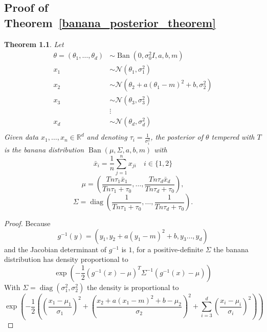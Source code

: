 \documentclass[english,twoside,openright]{HYgraduMLDS}
\newtheorem{theorem}{Theorem}
\newcommand{\R}{\mathbb{R}}
\newcommand{\caln}{{\mathcal{N}}}
\DeclareMathOperator{\ban}{Ban}
\DeclareMathOperator{\diag}{diag}
\begin{document}
\begin{appendices}
\myappendixtitle

\chapter{Proof of Theorem~\ref{banana_posterior_theorem}}\label{banana_posterior_theorem_proof}

\setcounter{temp_counter}{\value{theorem}}
\setcounter{theorem}{\value{banana_posterior_theorem_number}}
\addtocounter{theorem}{-1}
\begin{theorem}
    Let
    \begin{align*}
        \theta = (\theta_1,\dotsc, \theta_d) &\sim
        \ban(0, \sigma_0^2I, a, b, m) \\
        x_1 &\sim \caln(\theta_1, \sigma_1^2) \\
        x_2 &\sim \caln(\theta_2 + a(\theta_1 - m)^2 + b, \sigma_2^2)\\
        x_3 &\sim \caln(\theta_3, \sigma_3^2) \\
            &\vdots \\
        x_d &\sim \caln(\theta_d, \sigma_d^2) \\
    \end{align*}
    Given data \(x_1,\dotsc, x_n\in \R^d\) and
    denoting \(\tau_i = \frac{1}{\sigma_i^2}\),
    the posterior of \(\theta\) tempered with \(T\) is the banana distribution
    \(\ban(\mu, \Sigma, a, b, m)\)
    with
    \[
        \bar{x}_i = \frac{1}{n}\sum_{j=1}^n x_{ji} \quad i\in \{1, 2\}
    \]
    \[
        \mu = \left(\frac{Tn\tau_1\bar{x}_1}{Tn\tau_1 + \tau_0},\dotsc,
        \frac{Tn\tau_d\bar{x}_d}{Tn\tau_d + \tau_0}\right),
    \]
    \[
        \Sigma = \diag\left(
            \frac{1}{Tn\tau_1 + \tau_0},\dotsc,
            \frac{1}{Tn\tau_d + \tau_0}
        \right).
    \]
\end{theorem}
\begin{proof}
    Because
    \[
    g^{-1}(y) = (y_1, y_2 + a(y_1 - m)^2 + b, y_3\dotsc, y_d)
    \]
    and the Jacobian determinant of \(g^{-1}\) is \(1\),
    for a positive-definite \(\Sigma\) the banana distribution has
    density proportional to
    \[
    \exp\left(-\frac{1}{2}(g^{-1}(x) - \mu)^T\Sigma^{-1}(g^{-1}(x) - \mu)\right)
    \]
    With \(\Sigma = \diag(\sigma_1^2, \sigma_2^2)\) the density is proportional
    to
    \[
    \exp
    \left(-\frac{1}{2}\left(\left(\frac{x_1 - \mu_1}{\sigma_1}\right)^2
    + \left(\frac{x_2 + a(x_1 - m)^2 + b - \mu_2}{\sigma_2}\right)^2
    + \sum_{i=3}^d\left(\frac{x_i - \mu_i}{\sigma_i}\right)^2\right)\right)
    \]


\end{proof}
\end{appendices}
\end{document}
